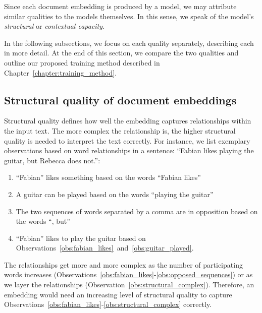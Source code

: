 Since each document embedding is produced by a model, we may attribute similar
qualities to the models themselves. In this sense, we speak of the model's
\emph{structural} or \emph{contextual capacity}.

In the following subsections, we focus on each quality separately, describing
each in more detail. At the end of this section, we compare the two
qualities and outline our proposed training method described in
Chapter~\ref{chapter:training_method}.

\subsection{Structural quality of document embeddings}

Structural quality defines how well the embedding captures relationships within
the input text. The more complex the relationship is, the higher structural
quality is needed to interpret the text correctly. For instance, we list
exemplary observations based on word relationships in a sentence: ``Fabian
likes playing the guitar, but Rebecca does not.'':

\begin{enumerate}[label={Observation \arabic*.},ref=\arabic*,wide=0pt]

  \item ``Fabian'' likes something based on the words ``Fabian likes''
    \label{obs:fabian_likes}

  \item A guitar can be played based on the words ``playing the guitar''
    \label{obs:guitar_played}

  \item The two sequences of words separated by a comma are in opposition based
    on the words ``, but'' \label{obs:opposed_sequences}

  \item ``Fabian'' likes to play the guitar based on
    Observations~\ref{obs:fabian_likes}~and~\ref{obs:guitar_played}.
    \label{obs:structural_complex}

\end{enumerate}

The relationships get more and more complex as the number of participating words increases (Observations~\ref{obs:fabian_likes}-\ref{obs:opposed_sequences}) or as we
layer the relationships (Observation~\ref{obs:structural_complex}).
Therefore, an embedding would need an increasing level of structural quality to
capture Observations~\ref{obs:fabian_likes}-\ref{obs:structural_complex}
correctly.

